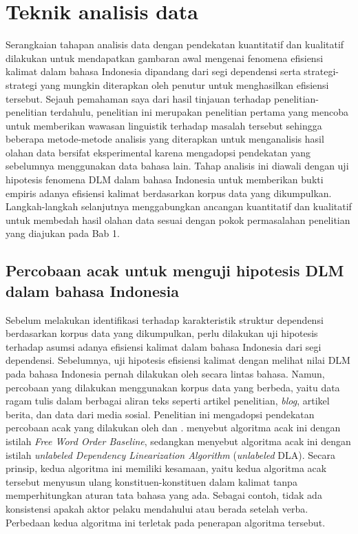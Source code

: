 \section{Teknik analisis data}

Serangkaian tahapan analisis data dengan pendekatan kuantitatif dan kualitatif dilakukan untuk mendapatkan gambaran awal mengenai fenomena efisiensi kalimat dalam bahasa Indonesia dipandang dari segi dependensi serta strategi-strategi yang mungkin diterapkan oleh penutur untuk menghasilkan efisiensi tersebut. Sejauh pemahaman saya dari hasil tinjauan terhadap penelitian-penelitian terdahulu, penelitian ini merupakan penelitian pertama yang mencoba untuk memberikan wawasan linguistik terhadap masalah tersebut sehingga beberapa metode-metode analisis yang diterapkan untuk menganalisis hasil olahan data bersifat eksperimental karena mengadopsi pendekatan yang sebelumnya menggunakan data bahasa lain. Tahap analisis ini diawali dengan uji hipotesis fenomena DLM dalam bahasa Indonesia untuk memberikan bukti empiris adanya efisiensi kalimat berdasarkan korpus data yang dikumpulkan. Langkah-langkah selanjutnya menggabungkan ancangan kuantitatif dan kualitatif untuk membedah hasil olahan data sesuai dengan pokok permasalahan penelitian yang diajukan pada Bab 1.

\subsection{Percobaan acak untuk menguji hipotesis DLM dalam bahasa Indonesia}
Sebelum melakukan identifikasi terhadap karakteristik struktur dependensi berdasarkan korpus data yang dikumpulkan, perlu dilakukan uji hipotesis terhadap asumsi adanya efisiensi kalimat dalam bahasa Indonesia dari segi dependensi. Sebelumnya, uji hipotesis efisiensi kalimat dengan melihat nilai DLM pada bahasa Indonesia pernah dilakukan oleh \cite{futrell2015large} secara lintas bahasa. Namun, percobaan yang dilakukan \cite{futrell2015large} menggunakan korpus data yang berbeda, yaitu data ragam tulis dalam berbagai aliran teks seperti artikel penelitian, \textit{blog}, artikel berita, dan data dari media sosial. Penelitian ini mengadopsi pendekatan percobaan acak yang dilakukan oleh \cite{futrell2015large} dan \cite{gildea2010grammars}. \cite{futrell2015large} menyebut algoritma acak ini dengan istilah \textit{Free Word Order Baseline}, sedangkan \cite{gildea2010grammars} menyebut algoritma acak ini dengan istilah \textit{unlabeled Dependency Linearization Algorithm} (\textit{unlabeled} DLA). Secara prinsip, kedua algoritma ini memiliki kesamaan, yaitu kedua algoritma acak tersebut menyusun ulang konstituen-konstituen dalam kalimat tanpa memperhitungkan aturan tata bahasa yang ada. Sebagai contoh, tidak ada konsistensi apakah aktor pelaku mendahului atau berada setelah verba. Perbedaan kedua algoritma ini terletak pada penerapan algoritma tersebut. 

